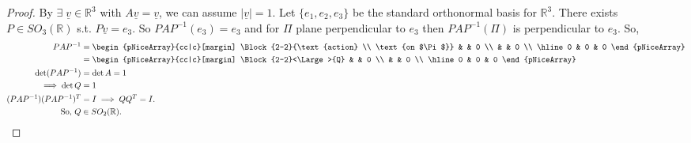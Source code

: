 \begin{proof}
    By  $\exists \; \underline{v} \in \mathbb{R}^3$ with $A \underline{v} = \underline{v}$, we can assume $|\underline{v}| = 1$.
    Let $\{e_1, e_2, e_3\}$ be the standard orthonormal basis for $\mathbb{R}^3$.
    There exists $P \in SO_3(\mathbb{R})$ s.t. $P \underline{v} = e_3$.
    So $PAP^{-1}(e_3) = e_3$ and for $\Pi$ plane perpendicular to $e_3$ then $PAP^{-1}(\Pi)$ is perpendicular to $e_3$.
    So, 
    \begin{align*}
        PAP^{-1} &= \begin{pNiceArray}{cc|c}[margin]
            \Block{2-2}{\text{action} \\ \text{on $\Pi$}} & & 0 \\
            & & 0 \\
            \hline
            0 & 0 & 0
            \end{pNiceArray} \\
            &= \begin{pNiceArray}{cc|c}[margin]
                \Block{2-2}<\Large>{Q} & & 0 \\
                & & 0 \\
                \hline
                0 & 0 & 0
                \end{pNiceArray} \\
            \det (P A P^{-1}) &= \det A = 1 \\
            \implies \det Q &= 1 \\
            (P A P^{-1}) (P A P^{-1})^T &= I \implies Q Q^T = I.\\
            \text{So, } Q &\in SO_2(\mathbb{R}).
    \end{align*} 
\end{proof}  

